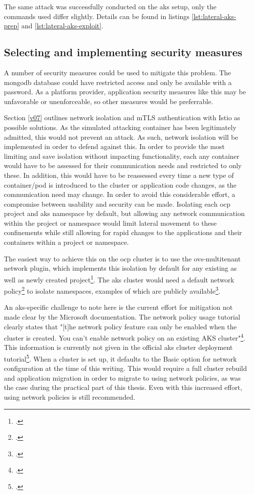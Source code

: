 The same attack was successfully conducted on the \gls{aks} setup, only the commands used differ slightly. Details can be found in listings \ref{lst:lateral-aks-prep} and \ref{lst:lateral-aks-exploit}.

\subsection{Selecting and implementing security measures}

A number of security measures could be used to mitigate this problem.
The mongodb database could have restricted access and only be available with a password. 
As a platform provider, application security measures like this may be unfavorable or unenforceable, so other measures would be preferrable.

Section \ref{v07} outlines network isolation and mTLS authentication with Istio as possible solutions. As the simulated attacking container has been legitimately admitted, this would not prevent an attack. As such, network isolation will be implemented in order to defend against this.
In order to provide the most limiting and save isolation without impacting functionality, each any container would have to be assessed for their communication needs and restricted to only these. In addition, this would have to be reassessed every time a new type of container/pod is introduced to the cluster or application code changes, as the communication need may change. In order to avoid this considerable effort, a compromise between usability and security can be made. Isolating each \gls{ocp} project and \gls{aks} namespace by default, but allowing any network communication within the project or namespace would limit lateral movement to these confinements while still allowing for rapid changes to the applications and their containers within a project or namespace. 

The easiest way to achieve this on the \gls{ocp} cluster is to use the ovs-multitenant network plugin, which implements this isolation by default for any existing as well as newly created project\footcite[][, section 'Overview']{ocpNetworkPlugins}. The \gls{aks} cluster would need a default network policy\footcite[][, section 'Default Policies']{egressNetPol} to isolate namespaces, examples of which are publicly available\footcite[][, section 'Example']{netPolExample}.

An \gls{aks}-specific challenge to note here is the current effort for mitigation not made clear by the Microsoft documentation. The network policy usage tutorial clearly states that "[t]he network policy feature can only be enabled when the cluster is created. You can't enable network policy on an existing AKS cluster"\footcite[][, section 'Frequently asked questions']{aksNetPolUse}. This information is currently not given in the official \gls{aks} cluster deployment tutorial\footcite{aksSetup}. When a cluster is set up, it defaults to the Basic option for network configuration at the time of this writing. This would require a full cluster rebuild and application migration in order to migrate to using network policies, as was the case during the practical part of this thesis.
Even with this increased effort, using network policies is still recommended.


